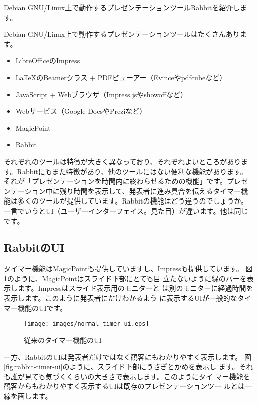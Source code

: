 \documentclass[mingoth,a4paper]{jsarticle}
\begin{document}
\label{sec:kou}

Debian GNU/Linux上で動作するプレゼンテーションツールRabbitを紹介します。

Debian GNU/Linux上で動作するプレゼンテーションツールはたくさんあります。

\begin{itemize}
 \item LibreOfficeのImpress
 \item LaTeXのBeamerクラス + PDFビューアー（Evinceやpdfcubeなど）
 \item JavaScript + Webブラウザ（Impress.jsやshowoffなど）
 \item Webサービス（Google DocsやPreziなど）
 \item MagicPoint
 \item Rabbit
\end{itemize}

それぞれのツールは特徴が大きく異なっており、それぞれよいところがありま
す。Rabbitにもまた特徴があり、他のツールにはない便利な機能があります。
それが「プレゼンテーションを時間内に終わらせるための機能」です。プレゼ
ンテーション中に残り時間を表示して、発表者に進み具合を伝えるタイマー機
能は多くのツールが提供しています。Rabbitの機能はどう違うのでしょうか。
一言でいうとUI（ユーザーインターフェイス。見た目）が違います。他は同じ
です。

\subsection{RabbitのUI}

タイマー機能はMagicPointも提供していますし、Impressも提供しています。
図\ref{fig:normal-timer-ui}のように、MagicPointはスライド下部にとても目
立たないように緑のバーを表示します。Impressはスライド表示用のモニターと
は別のモニターに経過時間を表示します。このように発表者にだけわかるよう
に表示するUIが一般的なタイマー機能のUIです。

\begin{figure}[ht]
  \begin{center}
    \texttt{[image: images/normal-timer-ui.eps]}
  \end{center}
  \caption{従来のタイマー機能のUI}
  \label{fig:normal-timer-ui}
\end{figure}

一方、RabbitのUIは発表者だけではなく観客にもわかりやすく表示します。
図\ref{fig:rabbit-timer-ui}のように、スライド下部にうさぎとかめを表示し
ます。それも誰が見ても気づくくらいの大きさで表示します。このようにタイ
マー機能を観客からもわかりやすく表示するUIは既存のプレゼンテーションツー
ルとは一線を画します。
\end{document}
